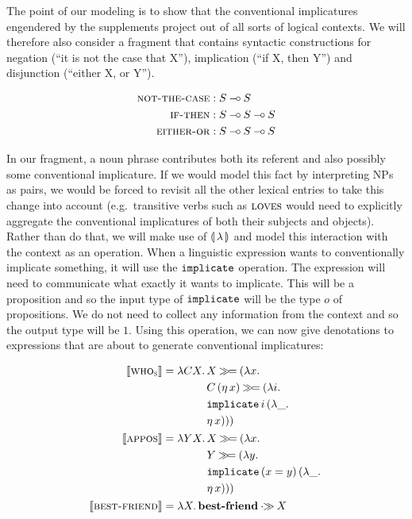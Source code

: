 The point of our modeling is to show that the conventional implicatures
engendered by the supplements project out of all sorts of logical
contexts. We will therefore also consider a fragment that contains
syntactic constructions for negation (``it is not the case that X''),
implication (``if X, then Y'') and disjunction (``either X, or Y'').

\begin{align*}
  \textsc{not-the-case} &: S \mathbin{{-}\mkern-3.5mu{\circ}} S \\
  \textsc{if-then} &: S \mathbin{{-}\mkern-3.5mu{\circ}} S \mathbin{{-}\mkern-3.5mu{\circ}} S \\
  \textsc{either-or} &: S \mathbin{{-}\mkern-3.5mu{\circ}} S \mathbin{{-}\mkern-3.5mu{\circ}} S
\end{align*}

In our fragment, a noun phrase contributes both its referent and also
possibly some conventional implicature. If we would model this fact by
interpreting NPs as pairs, we would be forced to revisit all the other
lexical entries to take this change into account (e.g.\ transitive verbs
such as $\textsc{loves}$ would need to explicitly aggregate the conventional
implicatures of both their subjects and objects). Rather than do that, we
will make use of $\llparenthesis \, \lambda \, \rrparenthesis$ and model this interaction with the
context as an operation. When a linguistic expression wants to
conventionally implicate something, it will use the $\mathtt{implicate}$
operation. The expression will need to communicate what exactly it wants to
implicate. This will be a proposition and so the input type of
$\mathtt{implicate}$ will be the type $o$ of propositions. We do not need to
collect any information from the context and so the output type will be
$1$. Using this operation, we can now give denotations to expressions that
are about to generate conventional implicatures:

\begin{align*}
  \llbracket \textsc{who}_{\textsc{s}} \rrbracket &= \lambda C X.\, \begin{aligned}[t]
      &X \mathbin{\gg\!=} (\lambda x.\,  \\
      &C\,(\eta\,x) \mathbin{\gg\!=} (\lambda i.\,  \\
      &\mathtt{implicate}\,i\,(\lambda \_.\,  \\
      &\eta\,x)))
    \end{aligned} \\
  \llbracket \textsc{appos} \rrbracket &= \lambda Y X.\, \begin{aligned}[t]
      &X \mathbin{\gg\!=} (\lambda x.\,  \\
      &Y \mathbin{\gg\!=} (\lambda y.\,  \\
      &\mathtt{implicate}\,(x = y)\,(\lambda \_.\,  \\
      &\eta\,x)))
    \end{aligned} \\
  \llbracket \textsc{best-friend} \rrbracket &= \lambda X.\, \textbf{best-friend} \mathbin{\cdot\!\!\gg} X
\end{align*}

